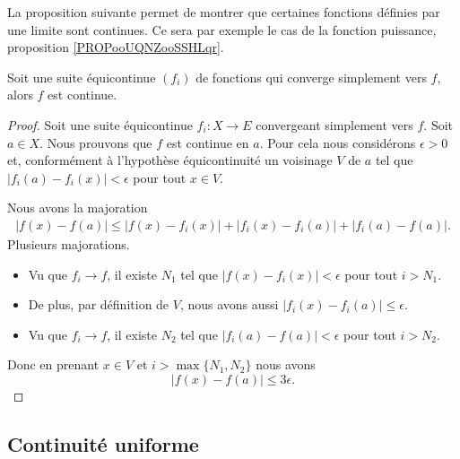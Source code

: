 La proposition suivante permet de montrer que certaines fonctions définies par une limite sont continues. Ce sera par exemple le cas de la fonction puissance, proposition \ref{PROPooUQNZooSSHLqr}.
\begin{proposition}     \label{PROPooICNNooAMjcut}
	Soit une suite équicontinue \( (f_i)\) de fonctions qui converge simplement vers \( f\), alors \( f\) est continue.
\end{proposition}

\begin{proof}
	Soit une suite équicontinue \( f_i\colon X\to E\) convergeant simplement vers \( f\). Soit \( a\in X\). Nous prouvons que \( f\) est continue en \( a\). Pour cela nous considérons \( \epsilon>0\) et, conformément à l'hypothèse équicontinuité un voisinage \( V\) de \( a\) tel que \( | f_i(a)-f_i(x) |<\epsilon\) pour tout \( x\in V\).

	Nous avons la majoration
	\begin{subequations}
		\begin{align}
			| f(x)-f(a) |\leq | f(x)-f_i(x) |+| f_i(x)-f_i(a) |+| f_i(a)-f(a) |.
		\end{align}
	\end{subequations}
	Plusieurs majorations.
	\begin{itemize}
		\item
		      Vu que \( f_i\to f\), il existe \( N_1\) tel que \( | f(x)-f_i(x) |<\epsilon\) pour tout \( i>N_1\).
		\item
		      De plus, par définition de \( V\), nous avons aussi \( | f_i(x)-f_i(a) |\leq \epsilon\).
		\item
		      Vu que \( f_i\to f\), il existe \( N_2\) tel que \( | f_i(a)-f(a) |<\epsilon\) pour tout \( i>N_2\).
	\end{itemize}
	Donc en prenant \( x\in V\) et \( i>\max\{ N_1,N_2 \}\) nous avons
	\begin{equation}
		| f(x)-f(a) |\leq 3\epsilon.
	\end{equation}
\end{proof}


\subsection{Continuité uniforme}

